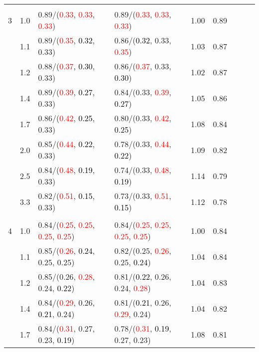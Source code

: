 \documentclass[10pt,a4paper]{report}
\begin{document}
\begin{table}[!htbp]
\begin{center}
{\begin{tabular}{ccllccccc}
			&&&&\\
			3			&1.0&0.89/(\textcolor{red}{0.33}, \textcolor{red}{0.33}, \textcolor{red}{0.33})&0.89/(\textcolor{red}{0.33}, \textcolor{red}{0.33}, \textcolor{red}{0.33})&1.00&0.89\\
			&1.1&0.89/(\textcolor{red}{0.35}, \textcolor{black}{0.32}, 0.33)&0.86/(\textcolor{black}{0.32}, 0.33, \textcolor{red}{0.35})&1.03&0.87\\
			&1.2&0.88/(\textcolor{red}{0.37}, \textcolor{black}{0.30}, 0.33)&0.86/(\textcolor{red}{0.37}, 0.33, \textcolor{black}{0.30})&1.02&0.87\\
			&1.4&0.89/(\textcolor{red}{0.39}, \textcolor{black}{0.27}, 0.33)&0.84/(0.33, \textcolor{red}{0.39}, \textcolor{black}{0.27})&1.05&0.86\\
			&1.7&0.86/(\textcolor{red}{0.42}, \textcolor{black}{0.25}, 0.33)&0.80/(0.33, \textcolor{red}{0.42}, \textcolor{black}{0.25})&1.08&0.84\\
			&2.0&0.85/(\textcolor{red}{0.44}, \textcolor{black}{0.22}, 0.33)&0.78/(0.33, \textcolor{red}{0.44}, \textcolor{black}{0.22})&1.09&0.82\\
			&2.5&0.84/(\textcolor{red}{0.48}, \textcolor{black}{0.19}, 0.33)&0.74/(0.33, \textcolor{red}{0.48}, \textcolor{black}{0.19})&1.14&0.79\\
			&3.3&0.82/(\textcolor{red}{0.51}, \textcolor{black}{0.15}, 0.33)&0.73/(0.33, \textcolor{red}{0.51}, \textcolor{black}{0.15})&1.12&0.78\\
			&&&&\\
			4			&1.0&0.84/(\textcolor{red}{0.25}, \textcolor{red}{0.25}, \textcolor{red}{0.25}, \textcolor{red}{0.25})&0.84/(\textcolor{red}{0.25}, \textcolor{red}{0.25}, \textcolor{red}{0.25}, \textcolor{red}{0.25})&1.00&0.84\\
			&1.1&0.85/(\textcolor{red}{0.26}, \textcolor{black}{0.24}, 0.25, 0.25)&0.82/(0.25, \textcolor{red}{0.26}, 0.25, \textcolor{black}{0.24})&1.04&0.84\\
			&1.2&0.85/(0.26, \textcolor{red}{0.28}, 0.24, \textcolor{black}{0.22})&0.81/(\textcolor{black}{0.22}, 0.26, 0.24, \textcolor{red}{0.28})&1.04&0.83\\
			&1.4&0.84/(\textcolor{red}{0.29}, 0.26, \textcolor{black}{0.21}, 0.24)&0.81/(\textcolor{black}{0.21}, 0.26, \textcolor{red}{0.29}, 0.24)&1.04&0.82\\
			&1.7&0.84/(\textcolor{red}{0.31}, 0.27, 0.23, \textcolor{black}{0.19})&0.78/(\textcolor{red}{0.31}, \textcolor{black}{0.19}, 0.27, 0.23)&1.08&0.81\\

\end{tabular}}
\end{center}
\end{table}
\end{document}
